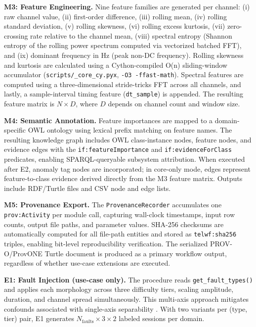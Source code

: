 \documentclass[conference]{IEEEtran}
\begin{document}
\textbf{M3: Feature Engineering.} Nine feature families are generated per channel: (i) raw channel value, (ii) first-order difference, (iii) rolling mean, (iv) rolling standard deviation, (v) rolling skewness, (vi) rolling excess kurtosis, (vii) zero-crossing rate relative to the channel mean, (viii) spectral entropy (Shannon entropy of the rolling power spectrum computed via vectorized batched FFT), and (ix) dominant frequency in Hz (peak non-DC frequency). Rolling skewness and kurtosis are calculated using a Cython-compiled O(n) sliding-window accumulator (\texttt{scripts/\_core\_cy.pyx}, \texttt{-O3 -ffast-math}). Spectral features are computed using a three-dimensional stride-tricks FFT across all channels, and lastly, a sample-interval timing feature (\texttt{dt\_sample}) is appended. The resulting feature matrix is $N \times D$, where $D$ depends on channel count and window size.

\textbf{M4: Semantic Annotation.} Feature importances are mapped to a domain-specific OWL ontology using lexical prefix matching on feature names. The resulting knowledge graph includes OWL class-instance nodes, feature nodes, and evidence edges with the \texttt{if:featureImportance} and \texttt{if:evidenceForClass} predicates, enabling SPARQL-queryable subsystem attribution. When executed after E2, anomaly tag nodes are incorporated; in core-only mode, edges represent feature-to-class evidence derived directly from the M3 feature matrix. Outputs include RDF/Turtle files and CSV node and edge lists.

\textbf{M5: Provenance Export.} The \texttt{ProvenanceRecorder} accumulates one \texttt{prov:Activity} per module call, capturing wall-clock timestamps, input row counts, output file paths, and parameter values. SHA-256 checksums are automatically computed for all file-path entities and stored as \texttt{telwf:sha256} triples, enabling bit-level reproducibility verification. The serialized PROV-O/ProvONE Turtle document is produced as a primary workflow output, regardless of whether use-case extensions are executed.

\textbf{E1: Fault Injection (use-case only).} The procedure reads \texttt{get\_fault\_types()} and applies each morphology across three difficulty tiers, scaling amplitude, duration, and channel spread simultaneously. This multi-axis approach mitigates confounds associated with single-axis separability \cite{wu2022benchmarks}. With two variants per (type, tier) pair, E1 generates $N_{\text{faults}} \times 3 \times 2$ labeled sessions per domain.
\end{document}
